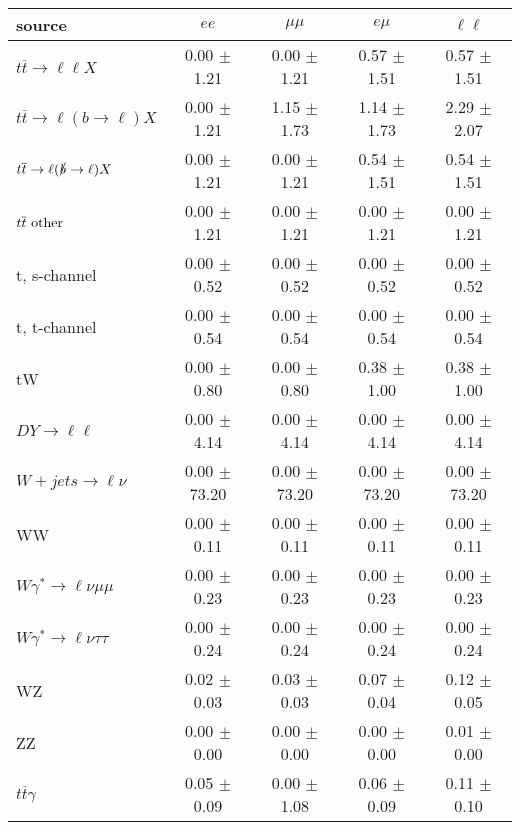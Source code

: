 \begin{tabular}{l|cccc} \hline\hline
source & $ee$ & $\mu\mu$ & $e\mu$ & $\ell\ell $ \\
\hline
$t\overline{t} \rightarrow \ell \ell X$ &  0.00 $\pm$  1.21 &  0.00 $\pm$  1.21 &  0.57 $\pm$  1.51 &  0.57 $\pm$  1.51 \\
$t\overline{t} \rightarrow \ell (b \rightarrow \ell) X$ &  0.00 $\pm$  1.21 &  1.15 $\pm$  1.73 &  1.14 $\pm$  1.73 &  2.29 $\pm$  2.07 \\
$t\overline{t} \rightarrow \ell (\slashed b \rightarrow \ell) X$ &  0.00 $\pm$  1.21 &  0.00 $\pm$  1.21 &  0.54 $\pm$  1.51 &  0.54 $\pm$  1.51 \\
        $t\overline{t}\ \rm{other}$ &  0.00 $\pm$  1.21 &  0.00 $\pm$  1.21 &  0.00 $\pm$  1.21 &  0.00 $\pm$  1.21 \\
\hline
                       t, s-channel &  0.00 $\pm$  0.52 &  0.00 $\pm$  0.52 &  0.00 $\pm$  0.52 &  0.00 $\pm$  0.52 \\
                       t, t-channel &  0.00 $\pm$  0.54 &  0.00 $\pm$  0.54 &  0.00 $\pm$  0.54 &  0.00 $\pm$  0.54 \\
                                 tW &  0.00 $\pm$  0.80 &  0.00 $\pm$  0.80 &  0.38 $\pm$  1.00 &  0.38 $\pm$  1.00 \\
\hline
         $DY \rightarrow \ell \ell$ &  0.00 $\pm$  4.14 &  0.00 $\pm$  4.14 &  0.00 $\pm$  4.14 &  0.00 $\pm$  4.14 \\
      $W+jets \rightarrow \ell \nu$ &  0.00 $\pm$ 73.20 &  0.00 $\pm$ 73.20 &  0.00 $\pm$ 73.20 &  0.00 $\pm$ 73.20 \\
                                 WW &  0.00 $\pm$  0.11 &  0.00 $\pm$  0.11 &  0.00 $\pm$  0.11 &  0.00 $\pm$  0.11 \\
\hline
$W\gamma^{*} \rightarrow \ell \nu \mu\mu$ &  0.00 $\pm$  0.23 &  0.00 $\pm$  0.23 &  0.00 $\pm$  0.23 &  0.00 $\pm$  0.23 \\
$W\gamma^{*} \rightarrow \ell \nu \tau\tau$ &  0.00 $\pm$  0.24 &  0.00 $\pm$  0.24 &  0.00 $\pm$  0.24 &  0.00 $\pm$  0.24 \\
                                 WZ &  0.02 $\pm$  0.03 &  0.03 $\pm$  0.03 &  0.07 $\pm$  0.04 &  0.12 $\pm$  0.05 \\
                                 ZZ &  0.00 $\pm$  0.00 &  0.00 $\pm$  0.00 &  0.00 $\pm$  0.00 &  0.01 $\pm$  0.00 \\
\hline
              $t\overline{t}\gamma$ &  0.05 $\pm$  0.09 &  0.00 $\pm$  1.08 &  0.06 $\pm$  0.09 &  0.11 $\pm$  0.10 \\

\end{tabular}
